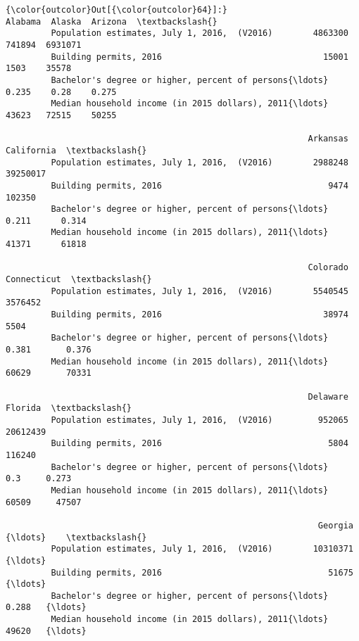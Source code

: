 \documentclass[11pt]{article}
\begin{document}
\begin{Verbatim}[commandchars=\\\{\}]
{\color{outcolor}Out[{\color{outcolor}64}]:}                                                     Alabama  Alaska  Arizona  \textbackslash{}
         Population estimates, July 1, 2016,  (V2016)        4863300  741894  6931071   
         Building permits, 2016                                15001    1503    35578   
         Bachelor's degree or higher, percent of persons{\ldots}    0.235    0.28    0.275   
         Median household income (in 2015 dollars), 2011{\ldots}    43623   72515    50255   
         
                                                            Arkansas California  \textbackslash{}
         Population estimates, July 1, 2016,  (V2016)        2988248   39250017   
         Building permits, 2016                                 9474     102350   
         Bachelor's degree or higher, percent of persons{\ldots}    0.211      0.314   
         Median household income (in 2015 dollars), 2011{\ldots}    41371      61818   
         
                                                            Colorado Connecticut  \textbackslash{}
         Population estimates, July 1, 2016,  (V2016)        5540545     3576452   
         Building permits, 2016                                38974        5504   
         Bachelor's degree or higher, percent of persons{\ldots}    0.381       0.376   
         Median household income (in 2015 dollars), 2011{\ldots}    60629       70331   
         
                                                            Delaware   Florida  \textbackslash{}
         Population estimates, July 1, 2016,  (V2016)         952065  20612439   
         Building permits, 2016                                 5804    116240   
         Bachelor's degree or higher, percent of persons{\ldots}      0.3     0.273   
         Median household income (in 2015 dollars), 2011{\ldots}    60509     47507   
         
                                                              Georgia   {\ldots}    \textbackslash{}
         Population estimates, July 1, 2016,  (V2016)        10310371   {\ldots}     
         Building permits, 2016                                 51675   {\ldots}     
         Bachelor's degree or higher, percent of persons{\ldots}     0.288   {\ldots}     
         Median household income (in 2015 dollars), 2011{\ldots}     49620   {\ldots}     
         

\end{Verbatim}
\end{document}
